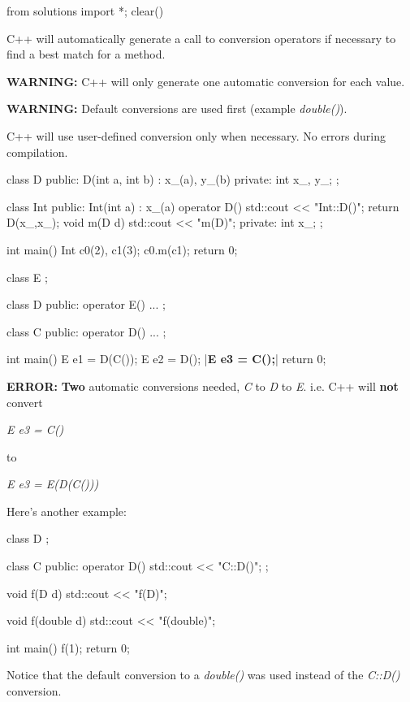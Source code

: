 \begin{python0}
from solutions import *; clear()
\end{python0}

C++ will automatically generate a call to conversion operators if
necessary to find a best match for a method.

\textbf{WARNING:} C++ will only generate one automatic conversion for
each value.

\textbf{WARNING:} Default conversions are used first (example
\textit{double()}).

C++ will use user-defined conversion only when necessary. No errors
during compilation.

\begin{consolethree}[escapeinside=||]
class D
{
public:
    D(int a, int b)
        : x_(a), y_(b)
    {}
private:
    int x_, y_;
};
\end{consolethree}

\begin{consolethree}[escapeinside=||]
class Int
{
public:
    Int(int a)
        : x_(a)
    {}
    operator D()
    {
        std::cout << "Int::D()\n";
        return D(x_,x_);
    }
    void m(D d)
    {
        std::cout << "m(D)\n";
    }
private:
    int x_;
};
\end{consolethree}

\begin{consolethree}[escapeinside=||]
int main()
{
    Int c0(2), c1(3);
    c0.m(c1);
    return 0;
}
\end{consolethree}

\begin{consolethree}[escapeinside=||]
class E {};

class D
{
public:
    operator E()
    {
        ...
    }
};

class C
{
public:
    operator D()
    {
        ...
    }
};

int main()
{
    E e1 = D(C());
    E e2 = D();
    |{\bf E e3 = C();}|
    return 0;
}
\end{consolethree}

\textbf{ERROR:} \textbf{Two} automatic conversions needed, \textit{C} to
\textit{D} to \textit{E}. i.e. C++ will \textbf{not} convert

\textit{E e3 = C()}

to

\textit{E e3 = E(D(C()))}

Here's another example:

\begin{consolethree}[escapeinside=||]
class D {};

class C
{
public:
    operator D() { std::cout << "C::D()\n"; }
};

void f(D d) { std::cout << "f(D)\n"; }

void f(double d) { std::cout << "f(double)\n"; }

int main()
{
    f(1);
    return 0;
}
\end{consolethree}

Notice that the default conversion to a \textit{double()} was used instead
of the \textit{C::D()} conversion.



